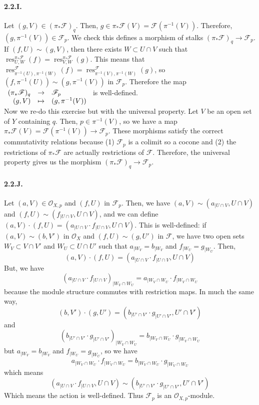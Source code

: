 \documentclass{article}
\DeclareMathOperator{\res}{res}
\newcommand{\applic}[4]{\begin{array}[t]{rcl}
#1 & \to & #2 \\
#3 & \mapsto & #4
\end{array}}
\newcommand{\Osheaf}{\mathscr{O}}
\newcommand{\Fsheaf}{\mathscr{F}}
\begin{document}
\paragraph{2.2.I.} Let $(g,V) \in (\pi_*\Fsheaf)_q$. Then, $g \in \pi_*\Fsheaf(V) = \Fsheaf(\pi^{-1}(V))$. Therefore, $(g,\pi^{-1}(V)) \in \Fsheaf_p$. We check this defines a morphism of stalks $(\pi_*\Fsheaf)_q \to \Fsheaf_p$. If $(f,U) \sim (g,V)$, then there exists $W \subset U \cap V$ such that $\res_{U,W}^{\pi_*\Fsheaf} (f) = \res_{V,W}^{\pi_*\Fsheaf} (g)$. This means that $\res_{\pi^{-1}(U),\pi^{-1}(W)}^\Fsheaf (f) = \res_{\pi^{-1}(V),\pi^{-1}(W)}^\Fsheaf(g)$, so $(f,\pi^{-1}(U)) \sim (g,\pi^{-1}(V))$ in $\Fsheaf_p$. Therefore the map $\applic{(\pi_*\Fsheaf)_q}{\Fsheaf_p}{(g,V)}{(g,\pi^{-1}(V))}$ is well-defined. \\
Now we re-do this exercise but with the universal property. Let $V$ be an open set of $Y$ containing $q$. Then, $p \in \pi^{-1}(V)$, so we have a map $\pi_*\Fsheaf(V) = \Fsheaf(\pi^{-1}(V)) \to \Fsheaf_p$. These morphisms satisfy the correct commutativity relations because (1) $\Fsheaf_p$ is a colimit so a cocone and (2) the restrictions of $\pi_*\Fsheaf$ are actually restrictions of $\Fsheaf$. Therefore, the universal property gives us the morphism $(\pi_*\Fsheaf)_q \to \Fsheaf_p$.

\paragraph{2.2.J.} Let $(a,V) \in \Osheaf_{X,p}$ and $(f,U)$ in $\Fsheaf_p$. Then, we have $(a,V) \sim (a_{\mid U \cap V},U \cap V)$ and $(f,U) \sim (f_{\mid U\cap V}, U\cap V)$, and we can define $(a,V) \cdot (f,U) = (a_{\mid U\cap V} \cdot f_{\mid U \cap V}, U \cap V)$. This is well-defined: if $(a,V) \sim (b,V')$ in $\Osheaf_X$ and $(f,U) \sim (g,U')$ in $\Fsheaf$, we have two open sets $W_V \subset V \cap V'$ and $W_U \subset U \cap U'$ such that $a_{\mid W_V} = b_{\mid W_V}$ and $f_{\mid W_U} = g_{\mid W_U}$. Then,
\[(a, V) \cdot (f,U) = (a_{\mid U \cap V} \cdot f_{\mid U \cap V}, U \cap V)\]
But, we have
\[(a_{\mid U \cap V} \cdot f_{\mid U \cap V})_{\mid W_V \cap W_U} = a_{\mid W_V \cap W_U} \cdot f_{\mid W_V \cap W_U}\]
because the module structure commutes with restriction maps. In much the same way,
\[(b, V') \cdot (g,U') = (b_{\mid U' \cap V'} \cdot g_{\mid U' \cap V'}, U' \cap V')\]
and
\[(b_{\mid U' \cap V'} \cdot g_{\mid U' \cap V'})_{\mid W_V \cap W_U} = b_{\mid W_V \cap W_U} \cdot g_{\mid W_V \cap W_U}\]
but $a_{\mid W_V} = b_{\mid W_V}$ and $f_{\mid W_U} = g_{\mid W_U}$, so we have
\[a_{\mid W_V \cap W_U} \cdot f_{\mid W_V \cap W_U} = b_{\mid W_V \cap W_U} \cdot g_{\mid W_V \cap W_U}\]
which means
\[(a_{\mid U \cap V} \cdot f_{\mid U \cap V}, U \cap V) \sim (b_{\mid U' \cap V'} \cdot g_{\mid U' \cap V'}, U' \cap V')\]
Which means the action is well-defined. Thus $\Fsheaf_p$ is an $\Osheaf_{X,p}$-module.
\end{document}
